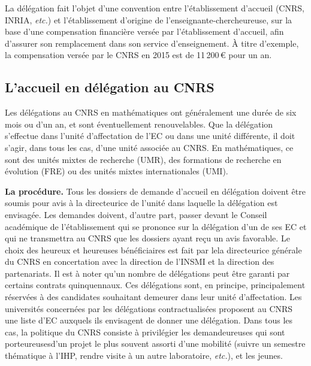 La d\'el\'egation fait l'objet d'une convention entre
l'\'etablissement d'accueil (CNRS, INRIA, {\em etc.}) et
l'\'etablisse\-ment d'origine de l'enseignant\mp e-chercheur\mp euse, sur la base
d'une compensation financi\`ere vers\'ee par l'\'etablissement
d'accueil, afin d'assurer son remplacement dans son service
d'enseignement. \`A titre d'exemple, la compensation vers\'ee par le
CNRS en 2015 est de 11\,200\,\euro{} pour un an.

\subsection*{L'accueil en d\'el\'egation au CNRS}


Les d\'el\'egations au CNRS en math\'ematiques ont g\'en\'eralement
une dur\'ee de six mois ou d'un an, et sont \'eventuellement
renouvelables. Que la d\'el\'egation s'effectue dans l'unit\'e
d'affectation de l'EC ou dans une unit\'e
diff\'erente, il doit s'agir, dans tous les cas, d'une unit\'e
associ\'ee au CNRS. En math\'ematiques, ce sont des unit\'es mixtes de
recherche (UMR), des formations de recherche en \'evolution (FRE)
ou des unit\'es mixtes internationales (UMI).

\textbf{La proc\'edure.} Tous les dossiers de demande d'accueil en
d\'el\'egation doivent \^etre soumis pour avis \`a la directeur\mp ice de
l'unit\'e dans laquelle la d\'el\'egation est envisag\'ee. Les
demandes doivent, d'autre part, passer devant le Conseil
acad\'emique de l'\'etablissement qui se prononce sur la d\'el\'egation d'un de ses EC
et qui ne transmettra au CNRS que les dossiers ayant re\c cu un
avis favorable. Le choix des heureux et heureuses b\'en\'eficiaires est fait par
le\mp la directeur\mp ice g\'en\'eral\mp e du CNRS en concertation avec la direction
de l'INSMI et la direction des partenariats. Il est \`a noter
qu'un nombre de d\'el\'egations peut \^etre garanti par certains
contrats quinquennaux. Ces d\'el\'egations sont, en principe,
principalement r\'eserv\'ees \`a des candidat\mp e\mp s souhaitant demeurer
dans leur unit\'e d'affectation. Les universit\'es concern\'ees par
les d\'el\'egations \og contractualis\'ees\fg{} proposent au CNRS
une liste d'EC auxquels ils envisagent de donner
une d\'el\'egation. Dans tous les cas, la politique du CNRS consiste
\`a privil\'egier les demandeur\mp euse\mp s qui sont porteur\mp euse\mp sd'un projet le plus souvent
assorti d'une mobilit\'e (suivre un semestre th\'ematique \`a l'IHP,
rendre visite \`a un autre laboratoire, {\em etc.}), et les jeunes. 

